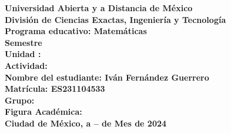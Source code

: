\documentclass{article}
\begin{document}
{
\begin{titlepage}
\centering
\vspace*{5cm} %

{\Huge\bfseries\textbf{Universidad Abierta y a Distancia de México}}\\[1cm]
{\Large\bfseries\textbf{División de Ciencias Exactas, Ingeniería y Tecnología}}\\[1cm]
{\Large\bfseries\textbf{Programa educativo: Matemáticas}}\\[0.5cm]
{\Large\bfseries\textbf{Semestre }}\\[0.5cm]
{\Large\bfseries\textbf{Unidad : }}\\[0.5cm]
{\Large\bfseries\textbf{Actividad: }}\\[2cm]
{\Large\bfseries\textbf{Nombre del estudiante: Iván Fernández Guerrero}}\\[0.5cm]
{\Large\bfseries\textbf{Matrícula: ES231104533}}\\[0.5cm]
{\Large\bfseries\textbf{Grupo: }}\\[0.5cm]
{\Large\bfseries\textbf{Figura Académica: }}\\[2cm]
{\Large\bfseries\textbf{Ciudad de México, a – de Mes de 2024}}\\[2cm]

\vfill
\end{titlepage}
\restoregeometry %
} %
\end{document}
